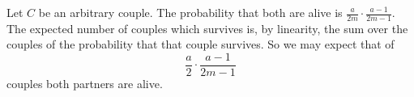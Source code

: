 \documentclass{article}
\begin{document}
\begin{ex}
Let $C$ be an arbitrary couple. The probability that both are alive is $\frac{a}{2m}\cdot\frac{a-1}{2m-1}$. The expected number of couples which survives is, by linearity, the sum over the couples of the probability that that couple survives. So we may expect that of 
\begin{equation*}
\frac{a}{2}\cdot\frac{a-1}{2m-1}
\end{equation*}
couples both partners are alive.
\begin{comment}
My first idea was to set up a recursive 2-ary function
\begin{equation*}
A:(m,a:\mathbb{N})\to(a\leq 2m)\to\mathbb{Q},
\end{equation*}
calculating the expected number of couples in which both people are alive. We intend that $A(m,a)$ is the expected number of couples in which both partners are alive, in the event that there were originally $m$ couples and that the amount of people alive is $a$. Now we define $A$ by
\begin{align*}
A(m,0) & := 0\\
A(m,1) & := 0\\
A(m,2m-1) & := m-1\\
A(m,2m) & := m
\intertext{and for $2\leq a \leq 2m-2$ we define}
A(m,a) & := \frac{a}{2m}\cdot\frac{a-1}{2m-1}\cdot (A(m-1,a-2)+1)
  \\
& \qquad +\frac{a}{m}\cdot \frac{2m-a}{2m-1}\cdot A(m-1,a-1)
  \\
& \qquad + \frac{2m-a}{2m}\cdot\frac{2m-a-1}{2m-1}\cdot A(m-1,a)
\end{align*}
This function terminates when $0\leq a\leq 2m$. The recursion is obtained as follows: With the probability that both partners are alive we expect the value of $A(m-1,a-2)+1$; with the probability that exactly one of the partners is dead, we expect the value $A(m-1,a-1)$ and with the probability that both partners are dead we expect the value $A(m-1,a)$. It is easy to see that the function
\begin{equation*}
(m,a)\mapsto m\cdot\frac{a}{2m}\cdot\frac{a-1}{2m-1}
\end{equation*}
satisfies the first four defining equations of $A$. A little calculation is now required:
\begin{align*}
m\cdot\frac{a}{2m}\cdot\frac{a-1}{2m-1} 
& = \frac{a}{2m}\cdot\frac{a-1}{2m-1}\cdot \Big((m-1)\cdot\frac{a-2}{2(m-1)}\cdot\frac{a-3}{2m-3}+1\Big)
  \\
& \qquad +\frac{a}{2m}\cdot \Big(1-\frac{a-1}{2m-1}\Big)\cdot (m-1)\cdot\frac{a-1}{2(m-1)}\cdot\frac{a-2}{2m-3}

\end{comment}
\end{ex}
\end{document}

